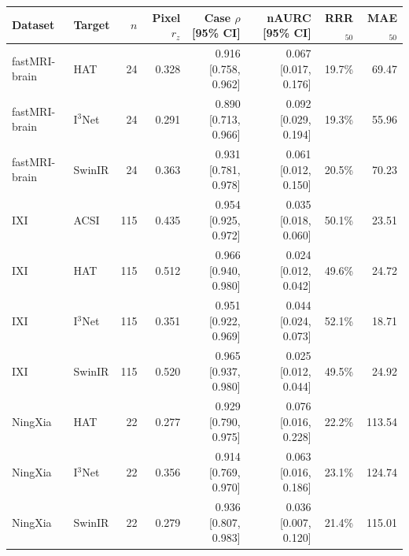 \begin{tabular}{llrrrrrr}
\toprule
Dataset & Target & $n$ & Pixel $r_z$ & Case $\rho$ [95\% CI] & nAURC [95\% CI] & RRR$_{50}$ & MAE$_{50}$ \\
\midrule
fastMRI-brain & HAT & 24 & 0.328 & 0.916 [0.758, 0.962] & 0.067 [0.017, 0.176] & 19.7\% & 69.47 \\
fastMRI-brain & I$^3$Net & 24 & 0.291 & 0.890 [0.713, 0.966] & 0.092 [0.029, 0.194] & 19.3\% & 55.96 \\
fastMRI-brain & SwinIR & 24 & 0.363 & 0.931 [0.781, 0.978] & 0.061 [0.012, 0.150] & 20.5\% & 70.23 \\
\midrule
IXI & ACSI & 115 & 0.435 & 0.954 [0.925, 0.972] & 0.035 [0.018, 0.060] & 50.1\% & 23.51 \\
IXI & HAT & 115 & 0.512 & 0.966 [0.940, 0.980] & 0.024 [0.012, 0.042] & 49.6\% & 24.72 \\
IXI & I$^3$Net & 115 & 0.351 & 0.951 [0.922, 0.969] & 0.044 [0.024, 0.073] & 52.1\% & 18.71 \\
IXI & SwinIR & 115 & 0.520 & 0.965 [0.937, 0.980] & 0.025 [0.012, 0.044] & 49.5\% & 24.92 \\
\midrule
NingXia & HAT & 22 & 0.277 & 0.929 [0.790, 0.975] & 0.076 [0.016, 0.228] & 22.2\% & 113.54 \\
NingXia & I$^3$Net & 22 & 0.356 & 0.914 [0.769, 0.970] & 0.063 [0.016, 0.186] & 23.1\% & 124.74 \\
NingXia & SwinIR & 22 & 0.279 & 0.936 [0.807, 0.983] & 0.036 [0.007, 0.120] & 21.4\% & 115.01 \\
\bottomrule
\end{tabular}
